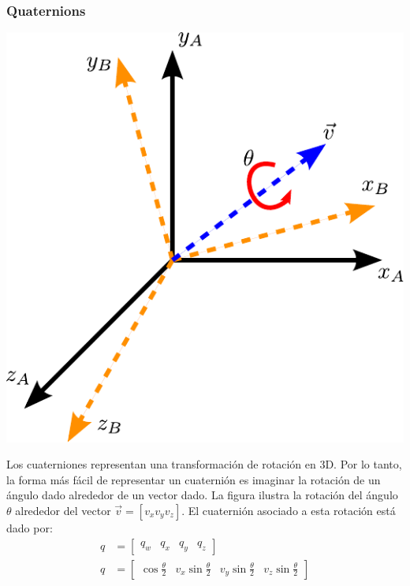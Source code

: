 \begin{frame}
    \frametitle{Quaternions}

    \begin{center}
        \includegraphics[width=0.3\columnwidth]{./images/quaternion.pdf}
    \end{center}

    Los cuaterniones representan una transformación de rotación en 3D. Por lo tanto, la forma más fácil de representar un cuaternión es imaginar la rotación de un ángulo dado alrededor de un vector dado. La figura ilustra la rotación del ángulo $\theta$ alrededor del vector $\vec{v} = [v_{x} v_{y} v_{z}]$. El cuaternión asociado a esta rotación está dado por:
    \begin{align*}
        q &= \begin{bmatrix} q_w & q_x & q_y & q_z\end{bmatrix}\\
        q &= \begin{bmatrix}
            \cos \frac{\theta}{2} & v_{x} \sin \frac{\theta}{2} & v_{y} \sin \frac{\theta}{2} & v_{z}\sin \frac{\theta}{2}
        \end{bmatrix}
    \end{align*}
\end{frame}

